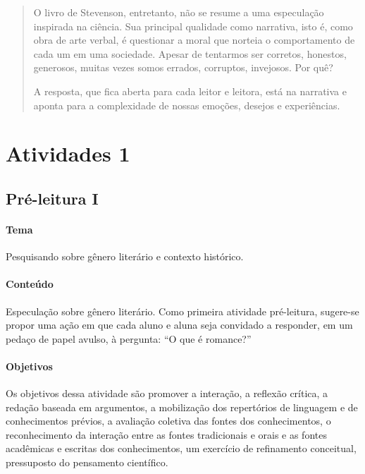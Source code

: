 \documentclass[12pt]{extarticle}
\begin{document}
{\begin{abstract}
O livro de Stevenson, entretanto, não se resume a uma especulação
inspirada na ciência. Sua principal qualidade como narrativa, isto é,
como obra de arte verbal, é questionar a moral que norteia o
comportamento de cada um em uma sociedade. Apesar de tentarmos ser
corretos, honestos, generosos, muitas vezes somos errados, corruptos,
invejosos. Por quê?

A resposta, que fica aberta para cada leitor e leitora, está na
narrativa e aponta para a complexidade de nossas emoções, desejos e
experiências.
\end{abstract}

\tableofcontents


\section{Atividades 1}

\subsection{Pré-leitura I}

\bnccativividadespreleitura
{}

\paragraph{Tema} Pesquisando sobre gênero literário e contexto histórico.



\paragraph{Conteúdo} Especulação sobre gênero literário.
Como primeira atividade pré-leitura, sugere-se propor uma ação em que
cada aluno e aluna seja convidado a responder, em um pedaço de papel
avulso, à pergunta: ``O que é romance?''

\paragraph{Objetivos}
Os objetivos dessa atividade são promover a interação, a reflexão
crítica, a redação baseada em argumentos, a mobilização dos repertórios
de linguagem e de conhecimentos prévios, a avaliação coletiva das fontes
dos conhecimentos, o reconhecimento da interação entre as fontes
tradicionais e orais e as fontes acadêmicas e escritas dos
conhecimentos, um exercício de refinamento conceitual, pressuposto do
pensamento científico.

}
\end{document}
